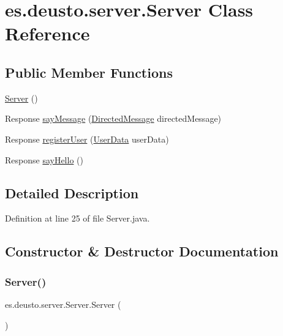 \hypertarget{classes_1_1deusto_1_1server_1_1_server}{}\section{es.\+deusto.\+server.\+Server Class Reference}
\label{classes_1_1deusto_1_1server_1_1_server}
\subsection*{Public Member Functions}
\begin{DoxyCompactItemize}
\item 
\mbox{\hyperlink{classes_1_1deusto_1_1server_1_1_server_a84f78162a65dd737f224eb2f94c43023}{Server}} ()
\item 
Response \mbox{\hyperlink{classes_1_1deusto_1_1server_1_1_server_ae90127b1bf186f1d871a5a0f98c37da0}{say\+Message}} (\mbox{\hyperlink{classes_1_1deusto_1_1serialization_1_1_directed_message}{Directed\+Message}} directed\+Message)
\item 
Response \mbox{\hyperlink{classes_1_1deusto_1_1server_1_1_server_a12f56d7a970c3c41fefe8ed2db835c0a}{register\+User}} (\mbox{\hyperlink{classes_1_1deusto_1_1serialization_1_1_user_data}{User\+Data}} user\+Data)
\item 
Response \mbox{\hyperlink{classes_1_1deusto_1_1server_1_1_server_ad12ddecc48082c7a61e5c9595977e2b5}{say\+Hello}} ()
\end{DoxyCompactItemize}


\subsection{Detailed Description}


Definition at line 25 of file Server.\+java.



\subsection{Constructor \& Destructor Documentation}
\mbox{\label{classes_1_1deusto_1_1server_1_1_server_a84f78162a65dd737f224eb2f94c43023}} 
\subsubsection{\texorpdfstring{Server()}{Server()}}
{\footnotesize\ttfamily es.\+deusto.\+server.\+Server.\+Server (\begin{DoxyParamCaption}{ }\end{DoxyParamCaption})}



